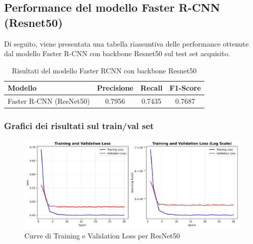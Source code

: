 \documentclass[12pt]{article}
\begin{document}
\subsection{Performance del modello Faster R-CNN (Resnet50)}
Di seguito, viene presentata una tabella riassuntiva delle performance ottenute dal modello Faster R-CNN con backbone Resnet50 sul test set acquisito.

\begin{table}[h!]
\centering
\label{tab:fasterrcnn_metrics_performance}
\begin{tabular}{|l|c|c|c|}
\hline
\textbf{Modello} & \textbf{Precisione} & \textbf{Recall} & \textbf{F1-Score} \\
\hline
Faster R-CNN (ResNet50) & 0.7956 & 0.7435 & 0.7687 \\
\hline
\end{tabular}
\caption{Risultati del modello Faster RCNN con backbone Resnet50}
\end{table}

\subsubsection{Grafici dei risultati sul train/val set}
\begin{figure}[H]
    \centering
    \includegraphics[width=1.00\textwidth]{./img/training_curves-resnet50.png}
    \caption{Curve di Training e Validation Loss per ResNet50}
    \label{fig:resnet50-training-curve}
\end{figure}
\end{document}

